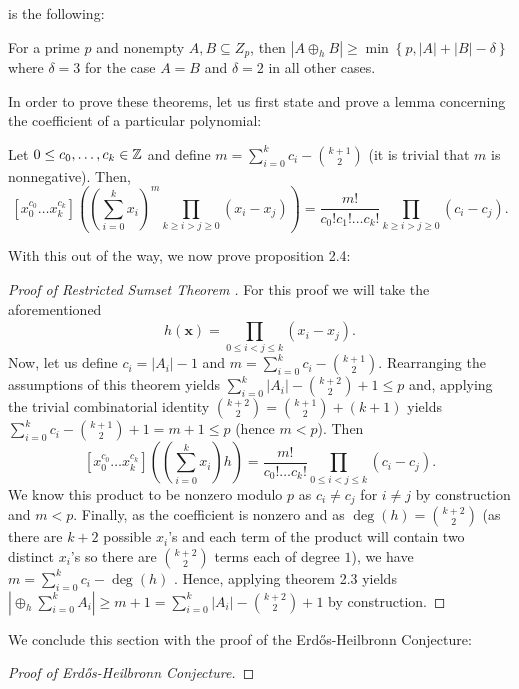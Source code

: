 		is the following: \begin{theorem}
			For a prime $p$ and nonempty $A,B \subseteq Z_{p}$,
			then $\left| A \oplus_{h} B \right| \ge \min \left\{ p,
			\left| A \right|  + \left| B \right|  - \delta \right\}
			$ where $\delta = 3$ for  the case $A = B$ and $\delta
			= 2$ in all other cases.  \end{theorem} In order to
			prove these theorems, let us first state and prove a
			lemma concerning the coefficient of a particular
			polynomial: \begin{lemma}[] Let $0 \le c_0, \ldots,
				c_{k} \in \mathbb{Z}$ and define $m = \sum_{i=0}^{k}
				c_{i} - \binom{k+1}{2}$ (it is trivial that $m$
				is nonnegative). Then,\[[x_0^{c_0}\ldots
				x_{k}^{c_{k}}] \left( \left( \sum_{i=0}^{k}
			x_{i} \right) ^{m} \prod_{k \ge i > j \ge 0}^{} \left(
x_{i} - x_{j} \right)  \right) = \frac{m!}{c_0! c_1! \ldots c_{k}!} \prod_{k
\ge i > j \ge 0}^{} \left( c_{i} - c_{j} \right).\] \end{lemma}  With this out of the way,
we now prove proposition 2.4: \begin{proof}[Proof of Restricted Sumset Theorem ]
	For this proof we will take the aforementioned \[ h\left( \textbf{x}
		\right) = \prod_{0\le i < j \le k}^{} \left( x_{i} - x_{j}
	\right) .\] Now, let us define $c_{i} = \left| A_{i} \right|  -1$ and
	$m = \sum_{i=0}^{k} c_{i} - \binom{k+1}{2}$. Rearranging the
	assumptions of this theorem yields $\sum_{i=0}^{k} \left| A_{i} \right|
	- \binom{k+2}{2} + 1 \le p$ and, applying the trivial combinatorial
	identity $\binom{k+2}{2} =  \binom{k+1}{2} +  (k+1)$ yields \\
	$\sum_{i=0}^{k} c_{i} - \binom{k+1}{2} + 1 = m + 1 \le p$ (hence $m <
	p$). Then  \[ [x_0^{c_0}\ldots x_{k}^{c_{k}}]\left( \left(
	\sum_{i=0}^{k} x_{i} \right) h \right) =  \frac{m!}{c_0! \ldots
	c_{k}!}\prod_{0 \le i < j \le k}^{} \left( c_{i} - c_{j} \right) .\] We
	know this product to be nonzero modulo  $p$ as  $c_{i} \neq c_{j}$  for
	$i \neq j$ by construction and $m < p$. Finally, as the coefficient is
	nonzero and as $\deg \left( h \right) =  \binom{k+2}{2}$ (as there are
	$k+2$ possible $x_{i}$'s and each term of the product will contain two
	distinct $x_{i}$'s so there are $\binom{k+2}{2}$ terms each of degree
	$1$), we have $m = \sum_{i=0}^{k} c_{i} - \deg \left( h \right)$
	. Hence, applying theorem 2.3 yields  $\left|
	\oplus _h \sum_{i= 0}^{k}  A_i \right| \ge m + 1 = \sum_{i=0}^{k}
	\left| A_{i} \right| - \binom{k+2}{2}+1$ by construction.  \end{proof}
We conclude this section with the proof of the Erdős-Heilbronn Conjecture:
\begin{proof}[Proof of Erdős-Heilbronn Conjecture]
\end{proof}
\newpage
